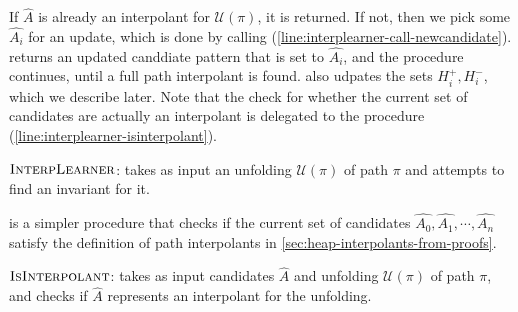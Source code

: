 If $\hat{A}$ is already an interpolant for $\mathcal{U}(\pi)$, it is returned. If not, then we pick some $\hat{A_i}$ for an update, which is done by calling \newcandidate (\autoref{line:interplearner-call-newcandidate}). \newcandidate returns an updated canddiate pattern that is set to $\hat{A_i}$, and the procedure continues, until a full path interpolant is found. \newcandidate also udpates the sets $H_i^{+}, H_i^{-}$, which we describe later. Note that the check for whether the current set of candidates are actually an interpolant is delegated to the \isinterpolant procedure (\autoref{line:interplearner-isinterpolant}).

\begin{algorithm}[ht]


  \caption{$\textsc{InterpLearner}$: takes as input an unfolding $\mathcal{U}(\pi)$ of path $\pi$ and attempts to find an invariant for it.}
  \label{alg:interplearner}
\end{algorithm}

\isinterpolant is a simpler procedure that checks if the current set of candidates $\hat{A_0}, \hat{A_1}, \cdots, \hat{A_n}$ satisfy the definition of path interpolants in \autoref{sec:heap-interpolants-from-proofs}.

\begin{algorithm}[ht]


  \caption{$\textsc{IsInterpolant}$: takes as input candidates $\hat{A}$ and unfolding $\mathcal{U}(\pi)$ of path $\pi$, and checks if $\hat{A}$ represents an interpolant for the unfolding.}
  \label{alg:isinterpolant}
\end{algorithm}

